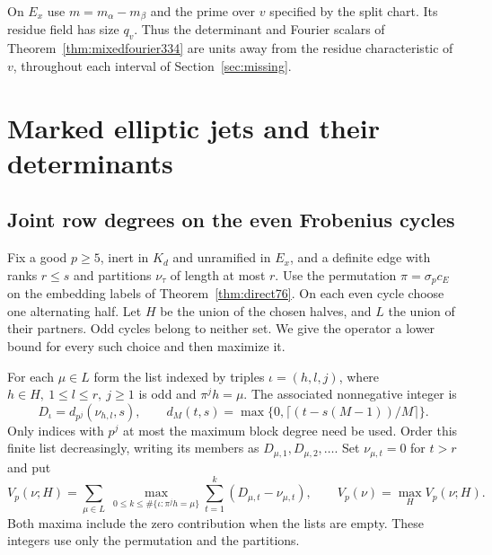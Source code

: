 \documentclass[a4paper,11pt]{article}
\theoremstyle{definition}
\theoremstyle{remark}
\numberwithin{equation}{section}
\begin{document}
On \(E_x\) use \(m=m_\alpha-m_\beta\) and the prime over \(v\)
specified by the split chart. Its residue field has size \(q_v\).
Thus the determinant and Fourier scalars of Theorem~\ref{thm:mixedfourier334}
are units away from the residue characteristic of \(v\), throughout
each interval of Section~\ref{sec:missing}.

\section{Marked elliptic jets and their determinants}\label{nav:chapter-split-elliptic-jets}

\subsection{Joint row degrees on the even Frobenius cycles}
\label{sec:inertrowdegrees461}

Fix a good \(p\ge5\), inert in \(K_d\) and unramified in \(E_x\),
and a definite edge with ranks \(r\le s\) and partitions
\(\nu_\tau\) of length at most \(r\). Use the permutation
\(\pi=\sigma_pc_E\) on the embedding labels of
Theorem~\ref{thm:direct76}. On each even cycle choose one
alternating half. Let \(H\) be the union of the chosen halves,
and \(L\) the union of their partners. Odd cycles belong to
neither set. We give the operator a lower bound for every such
choice and then maximize it.

For each \(\mu\in L\) form the list indexed by triples
\(\iota=(h,l,j)\), where \(h\in H,\ 1\le l\le r,\ j\ge1\) is
odd and \(\pi^j h=\mu\). The associated nonnegative integer is
\[
        D_\iota=d_{p^j}(\nu_{h,l},s),\qquad
        d_M(t,s)=\max\{0,\lceil(t-s(M-1))/M\rceil\}.
\]
Only indices with \(p^j\) at most the maximum block degree
need be used. Order this finite list decreasingly, writing its
members as \(D_{\mu,1},D_{\mu,2},\ldots\). Set \(\nu_{\mu,t}=0\)
for \(t>r\) and put
\[
 V_p(\nu;H)=\sum_{\mu\in L}\ 
     \max_{0\le k\le \#\{\iota:\pi^j h=\mu\}}
             \sum_{t=1}^k (D_{\mu,t}-\nu_{\mu,t}),
 \qquad V_p(\nu)=\max_H V_p(\nu;H).
\]
Both maxima include the zero contribution when the lists are
empty. These integers use only the permutation and the partitions.
\end{document}
